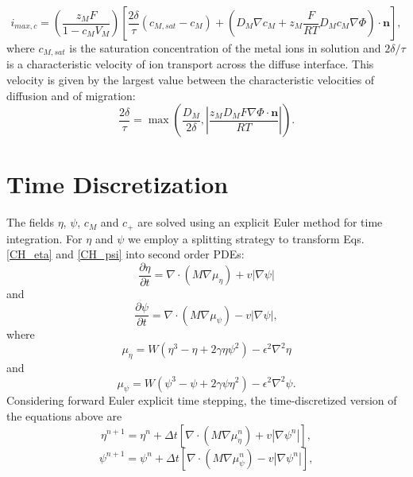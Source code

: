\documentclass[10pt]{article}
\begin{document}
\begin{equation}
i_{max,c}=\left( \frac{z_M F}{1-c_M V_M} \right) \left[ \frac{2\delta}{\tau}(c_{M,sat} - c_M ) + \left( D_M\nabla c_M +z_M\frac{F}{RT}D_M c_M \nabla \Phi \right) \cdot \mathbf{n} \right], 
\end{equation}
where $c_{M,sat}$ is the saturation concentration of the metal ions in solution and $2\delta/\tau$ is a characteristic velocity of ion transport across the diffuse interface. This velocity is given by the largest value between the characteristic velocities of diffusion and of migration:
\begin{equation}
\frac{2\delta}{\tau}=\max \left( \frac{D_M}{2\delta}, \left| \frac{z_M D_M F \nabla \Phi \cdot \mathbf{n}}{RT} \right| \right).
\end{equation}
\section{Time Discretization}
The fields $\eta$, $\psi$, $c_M$ and $c_+$ are solved using an explicit Euler method for time integration. For  $\eta$ and $\psi$ we employ a splitting strategy to transform Eqs. \eqref{CH_eta} and \eqref{CH_psi} into second order PDEs:
\begin{equation}
\label{eta_eq}
 \frac{\partial \eta}{\partial t} = \nabla \cdot \left( M \nabla  \mu_\eta \right) + v |\nabla \psi|
\end{equation}
and
\begin{equation}
\label{psi_eq}
\frac{\partial \psi}{\partial t} = \nabla \cdot \left( M \nabla \mu_\psi \right) - v |\nabla \psi|,
\end{equation}
where 
\begin{equation}
\label{mueta_eq}
\mu_\eta=W \left( \eta^3 - \eta +2 \gamma \eta \psi^2 \right) -\epsilon^2 \nabla^2 \eta
\end{equation}
and
\begin{equation}
\label{mupsi_eq}
\mu_\psi=W \left( \psi^3 - \psi +2 \gamma \psi  \eta^2 \right) -\epsilon^2 \nabla^2 \psi.
\end{equation}
Considering forward Euler explicit time stepping, the time-discretized version of the equations above are
\begin{equation}
\label{eta_eq_td}
\eta^{n+1} = \eta^n + \Delta t \left[ \nabla \cdot \left( M \nabla \mu_\eta^n \right) + v |\nabla \psi^n| \right],
\end{equation}
\begin{equation}
\label{psi_eq_td}
\psi^{n+1} = \psi^n +  \Delta t \left[  \nabla \cdot \left( M \nabla \mu_\psi^n \right) - v |\nabla \psi^n | \right],
\end{equation}
\end{document}
